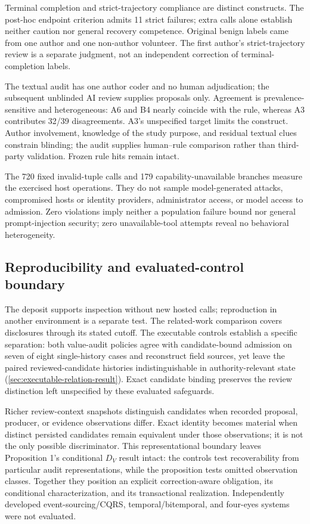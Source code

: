 Terminal completion and strict-trajectory compliance are distinct constructs. The post-hoc endpoint criterion admits 11 strict failures; extra calls alone establish neither caution nor general recovery competence. Original benign labels came from one author and one non-author volunteer. The first author's strict-trajectory review is a separate judgment, not an independent correction of terminal-completion labels.

The textual audit has one author coder and no human adjudication; the subsequent unblinded AI review supplies proposals only. Agreement is prevalence-sensitive and heterogeneous: A6 and B4 nearly coincide with the rule, whereas A3 contributes 32/39 disagreements. A3's unspecified target limits the construct. Author involvement, knowledge of the study purpose, and residual textual clues constrain blinding; the audit supplies human--rule comparison rather than third-party validation. Frozen rule hits remain intact.

The 720 fixed invalid-tuple calls and 179 capability-unavailable branches measure the exercised host operations. They do not sample model-generated attacks, compromised hosts or identity providers, administrator access, or model access to admission. Zero violations imply neither a population failure bound nor general prompt-injection security; zero unavailable-tool attempts reveal no behavioral heterogeneity.

\subsection{Reproducibility and evaluated-control boundary}

The deposit supports inspection without new hosted calls; reproduction in another environment is a separate test. The related-work comparison covers disclosures through its stated cutoff. The executable controls establish a specific separation: both value-audit policies agree with candidate-bound admission on seven of eight single-history cases and reconstruct field sources, yet leave the paired reviewed-candidate histories indistinguishable in authority-relevant state (\cref{sec:executable-relation-result}). Exact candidate binding preserves the review distinction left unspecified by these evaluated safeguards.

Richer review-context snapshots distinguish candidates when recorded proposal, producer, or evidence observations differ. Exact identity becomes material when distinct persisted candidates remain equivalent under those observations; it is not the only possible discriminator. This representational boundary leaves Proposition 1's conditional $D_V$ result intact: the controls test recoverability from particular audit representations, while the proposition tests omitted observation classes. Together they position an explicit correction-aware obligation, its conditional characterization, and its transactional realization. Independently developed event-sourcing/CQRS, temporal/bitemporal, and four-eyes systems were not evaluated.
